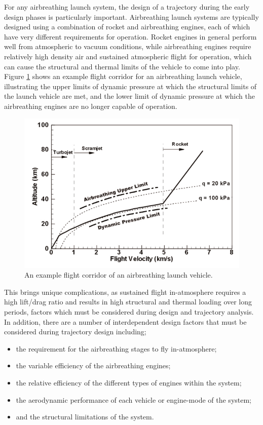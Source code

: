 For any airbreathing launch system, the design of a trajectory during the early design phases is particularly important. Airbreathing launch systems are typically designed using a combination of rocket and airbreathing engines, each of which have very different requirements for operation. Rocket engines in general perform well from atmospheric to vacuum conditions, while airbreathing engines require relatively high density air and sustained atmospheric flight for operation, which can cause the structural and thermal limits of the vehicle to come into play\cite{Preller2017b}. Figure \ref{fig:FlightCorridor} shows an example flight corridor for an airbreathing launch vehicle, illustrating the upper limits of dynamic pressure at which the structural limits of the launch vehicle are met, and the lower limit of dynamic pressure at which the airbreathing engines are no longer capable of operation. 
\begin{figure}[ht]
	\centering
	\includegraphics[width=0.7\linewidth]{figures/2_literature-review/FlightCorridor}
	\caption{An example flight corridor of an airbreathing launch vehicle\cite{Smart2007a}.}
	\label{fig:FlightCorridor}
\end{figure}
This brings unique complications, as sustained flight in-atmosphere requires a high lift/drag ratio and results in high structural and thermal loading over long periods, factors which must be considered during design and trajectory analysis. In addition, there are a number of interdependent design factors that must be considered during trajectory design including;
\begin{itemize}
	\item the requirement for the airbreathing stages to fly in-atmosphere;
	\item the variable efficiency of the airbreathing engines;
	\item the relative efficiency of the different types of engines within the system;
	\item the aerodynamic performance of each vehicle or engine-mode of the system;
	\item and the structural limitations of the system.
\end{itemize}
